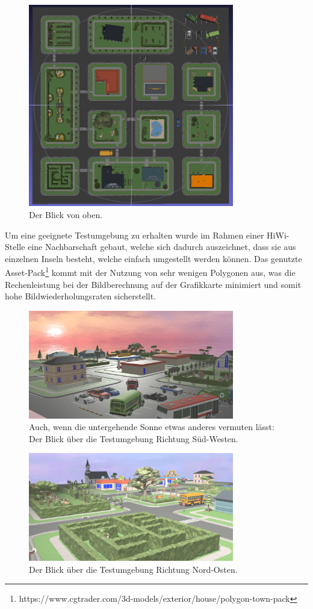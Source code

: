 \begin{figure}[h]
  \centering
  \includegraphics[width=0.8\textwidth]{images/WIM1.png}
  \caption{Der Blick von oben.}
  \label{fig:todo}
\end{figure}

Um eine geeignete Testumgebung zu erhalten wurde im Rahmen einer HiWi-Stelle eine Nachbarschaft gebaut, welche sich dadurch auszeichnet, dass sie aus einzelnen \glqq Inseln\grqq{} besteht, welche einfach umgestellt werden können. Das genutzte Asset-Pack\footnote{https://www.cgtrader.com/3d-models/exterior/house/polygon-town-pack} kommt mit der Nutzung von sehr wenigen Polygonen aus, was die Rechenleistung bei der Bildberechnung auf der Grafikkarte minimiert und somit hohe Bildwiederholungsraten sicherstellt.

\begin{figure}[]
  \centering
  \includegraphics[width=0.8\textwidth]{images/map1.png}
  \caption{Auch, wenn die untergehende Sonne etwas anderes vermuten lässt: Der Blick über die Testumgebung Richtung Süd-Westen.}
  \label{fig:todo}
\end{figure}

\begin{figure}[h]
  \centering
  \includegraphics[width=0.8\textwidth]{images/map2.png}
  \caption{Der Blick über die Testumgebung Richtung Nord-Osten.}
  \label{fig:todo}
\end{figure}
